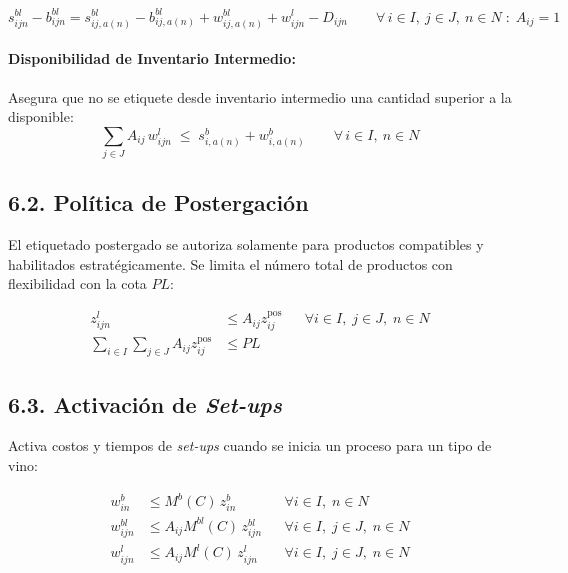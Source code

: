 \documentclass[11pt, letterpaper]{article}
\begin{document}
\begin{equation}
s^{bl}_{ijn} - b^{bl}_{ijn} = s^{bl}_{ij,a(n)} - b^{bl}_{ij,a(n)} + w^{bl}_{ij,a(n)} + w^l_{ijn} - D_{ijn} \qquad \forall\, i \in I,\ j \in J,\ n \in N \; : \; A_{ij}=1
\label{eq:balance-fg}
\end{equation}

\paragraph{Disponibilidad de Inventario Intermedio:}
Asegura que no se etiquete desde inventario intermedio una cantidad superior a la disponible:
\begin{equation}
\sum_{j \in J} A_{ij}\, w^l_{ijn} \;\leq\; s^b_{i,a(n)} + w^b_{i,a(n)} \qquad \forall\, i \in I,\ n \in N
\label{eq:disponibilidad-wip}
\end{equation}

\subsection*{6.2. Política de Postergación}
El etiquetado postergado se autoriza solamente para productos compatibles y habilitados estratégicamente. Se limita el número total de productos con flexibilidad con la cota $PL$:

\begin{align}
    z^l_{ijn} &\leq A_{ij} z^{\mathrm{pos}}_{ij} && \forall i \in I,\; j \in J,\; n \in N \label{eq:pos-activacion} \\
    \sum_{i \in I}\sum_{j \in J} A_{ij}z^{\mathrm{pos}}_{ij} &\leq PL \label{eq:pos-limite}
\end{align}

\subsection*{6.3. Activación de \textit{Set-ups}}
Activa costos y tiempos de \textit{set-ups} cuando se inicia un proceso para un tipo de vino:

\begin{align}
    w^b_{in} &\leq M^b(C) \, z^b_{in} && \forall i \in I,\; n \in N \label{eq:setup-b} \\
    w^{bl}_{ijn} &\leq A_{ij} M^{bl}(C)  \, z^{bl}_{ijn} && \forall i \in I,\; j \in J,\; n \in N \label{eq:setup-bl} \\
    w^l_{ijn} &\leq A_{ij} M^l(C) \, z^l_{ijn} && \forall i \in I,\; j \in J,\; n \in N \label{eq:setup-l}
\end{align}
\end{document}
